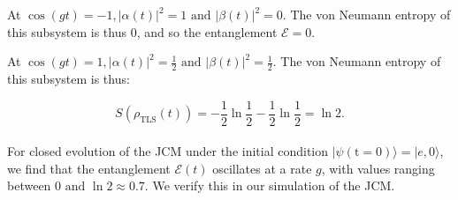 \documentclass[12pt]{article}
\begin{document}
At $\cos(gt) = -1, |\alpha(t)|^2 = 1 \text{ and } |\beta(t)|^2 = 0$. The von Neumann entropy of this subsystem is thus $0$, and so the entanglement $\mathcal{E}=0$.

At $\cos(gt) = 1, |\alpha(t)|^2 = \frac{1}{2} \text{ and } |\beta(t)|^2 = \frac{1}{2}$. The von Neumann entropy of this subsystem is thus:

\begin{equation*}
    S(\rho_{\scriptscriptstyle \text{TLS}}(t)) = - \frac{1}{2}\ln\frac{1}{2} - \frac{1}{2}\ln\frac{1}{2}
    = \ln2.
\end{equation*}
\\
For closed evolution of the JCM under the initial condition $|\psi(\text{t} = 0)\rangle = |e,0\rangle$, we find that the entanglement $\mathcal{E}(t)$ oscillates at a rate $g$, with values ranging between $0 \text{ and } \ln2 \approx 0.7$. We verify this in our simulation of the JCM.\\
\end{document}
